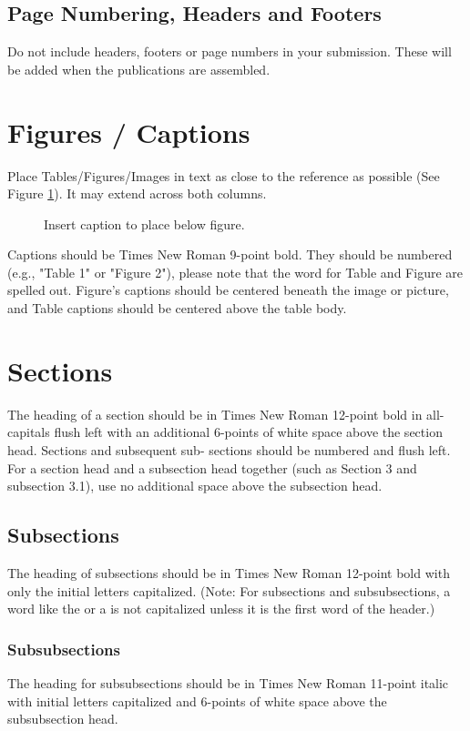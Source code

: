 \documentclass{sig-alternate-br}
\begin{document}
\subsection{Page Numbering, Headers and Footers}
Do not include headers, footers or page numbers in your submission.
These will be added when the publications are assembled.

\section{Figures / Captions}
Place Tables/Figures/Images in text as close to the reference as possible
(See Figure \ref{fig:abc}).  It may extend across both columns.

\begin{figure}
\centering
{}
\caption{Insert caption to place below figure.}
\label{fig:abc} %
\end{figure}

Captions should be Times New Roman 9-point bold.  They should be numbered (e.g., "Table 1" or "Figure 2"), please note that the word for Table and Figure are spelled out. Figure's captions should be centered beneath the image or picture, and Table captions should be centered above the table body.

\section{Sections}
The heading of a section should be in Times New Roman 12-point bold in all-capitals flush left with an additional 6-points of white space above the section head.  Sections and subsequent sub- sections should be numbered and flush left. For a section head and a subsection head together (such as Section 3 and subsection 3.1), use no additional space above the subsection head.

\subsection{Subsections}
The heading of subsections should be in Times New Roman 12-point bold with only the initial letters capitalized. (Note: For subsections and subsubsections, a word like the or a is not capitalized unless it is the first word of the header.)

\subsubsection{Subsubsections}
The heading for subsubsections should be in Times New Roman 11-point italic with initial letters capitalized and 6-points of white space above the subsubsection head.
\end{document}
